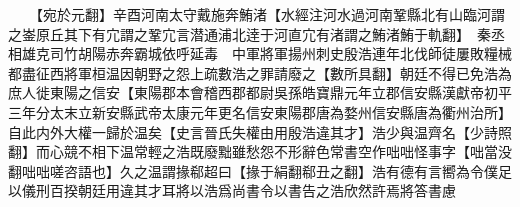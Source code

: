 　　【宛於元翻】辛酉河南太守戴施奔鮪渚【水經注河水過河南鞏縣北有山臨河謂之崟原丘其下有宂謂之鞏宂言潜通浦北逹于河直宂有渚謂之鮪渚鮪于軌翻】　秦丞相雄克司竹胡陽赤奔霸城依呼延毒　中軍將軍揚州刺史殷浩連年北伐師徒屢敗糧械都盡征西將軍桓温因朝野之怨上疏數浩之罪請廢之【數所具翻】朝廷不得已免浩為庶人徙東陽之信安【東陽郡本會稽西郡都尉吳孫皓寶鼎元年立郡信安縣漢獻帝初平三年分太末立新安縣武帝太康元年更名信安東陽郡唐為婺州信安縣唐為衢州治所】自此内外大權一歸於温矣【史言晉氏失權由用殷浩違其才】浩少與温齊名【少詩照翻】而心競不相下温常輕之浩既廢黜雖愁怨不形辭色常書空作咄咄怪事字【咄當没翻咄咄嗟咨語也】久之温謂掾郗超曰【掾于絹翻郗丑之翻】浩有德有言嚮為令僕足以儀刑百揆朝廷用違其才耳將以浩爲尚書令以書告之浩欣然許焉將答書慮